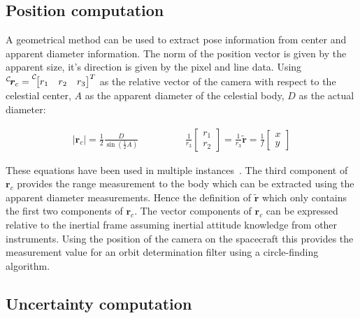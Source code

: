\subsection{Position computation}

A geometrical method can be used to extract pose information from center and apparent diameter information. The norm of the position vector is given by the apparent size, it's direction is given by the pixel and line data. Using $\leftexp{C}{\bm r_c} = \leftexp{C}{\begin{bmatrix} r_1 & r_2 & r_3 \end{bmatrix}}^T$ as the relative vector of the camera with respect to the celestial center, $A$ as the apparent diameter of the celestial body, $D$ as the actual diameter:

\begin{align}\label{eq:cad}
|\bm r_c| = \frac{1}{2}\frac{D}{\sin\left(\frac{1}{2} A\right)} \hspace{2cm} \frac{1}{r_3}\begin{bmatrix} r_1 \\ r_2 \end{bmatrix}= \frac{1}{r_3}\tilde{\bm r} = \frac{1}{f}\begin{bmatrix} x \\ y \end{bmatrix}
\end{align}

These equations have been used in multiple instances~\cite{Battin, Owen_OpNav}. The third component of $\bm r_c$ provides the range measurement to the body which can be extracted using the apparent diameter measurements. Hence the definition of $\tilde{\bm r}$ which only contains the first two components of $\bm r_c$. The vector components of $\bm r_{c}$ can be expressed relative to the inertial frame assuming inertial attitude knowledge from other instruments. Using the position of the camera on the spacecraft this provides the measurement value for an orbit determination filter using a circle-finding algorithm.  

\subsection{Uncertainty computation}

